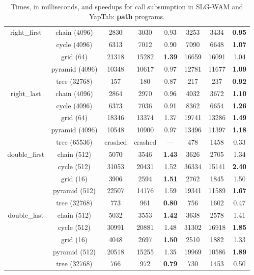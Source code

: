 \begin{table}[ht]
{\begin{tabular}{cc|ccc|ccc}
   \multirow{5}{*}{right\_first} &  \scriptsize{chain  (4096) }  &  2830 & 3030 &  0.93  & 3253 & 3434 &  \textbf{0.95} \\
   &  \scriptsize{cycle  (4096) }  &  6313 & 7012 &  0.90  & 7090 & 6648 &  \textbf{1.07} \\
   &  \scriptsize{grid  (64) }  &  21318 & 15282 &  \textbf{1.39}  & 16659 & 16091 &  1.04 \\
   &  \scriptsize{pyramid  (4096) }  &  10348 & 10617 &  0.97  & 12781 & 11677 &  \textbf{1.09} \\
   &  \scriptsize{tree  (32768) }  &  157 & 180 &  0.87  & 217 & 237 &  \textbf{0.92} \\
   \hline
   \multirow{5}{*}{right\_last} &  \scriptsize{chain  (4096) }  &  2864 & 2970 &  0.96  & 4032 & 3672 &  \textbf{1.10} \\
   &  \scriptsize{cycle  (4096) }  &  6373 & 7036 &  0.91  & 8362 & 6654 &  \textbf{1.26} \\
   &  \scriptsize{grid  (64) }  &  18346 & 13374 &  1.37  & 19741 & 13286 &  \textbf{1.49} \\
   &  \scriptsize{pyramid  (4096) }  &  10548 & 10900 &  0.97  & 13496 & 11397 &  \textbf{1.18} \\
   &  \scriptsize{tree  (65536) }  &  \scriptsize{crashed} & \scriptsize{crashed} &  ---  & 478 & 1458 &  0.33 \\
   \hline
   \multirow{5}{*}{double\_first} &  \scriptsize{chain  (512) }  &  5070 & 3546 &  \textbf{1.43}  & 3626 & 2705 &  1.34 \\
   &  \scriptsize{cycle  (512) }  &  31053 & 20431 &  1.52  & 36334 & 15141 &  \textbf{2.40} \\
   &  \scriptsize{grid  (16) }  &  3906 & 2594 &  \textbf{1.51}  & 2762 & 1845 &  1.50 \\
   &  \scriptsize{pyramid  (512) }  &  22507 & 14176 &  1.59  & 19341 & 11589 &  \textbf{1.67} \\
   &  \scriptsize{tree  (32768) }  &  773 & 961 &  \textbf{0.80}  & 756 & 1602 &  0.47 \\
   \hline
   \multirow{5}{*}{double\_last} &  \scriptsize{chain  (512) }  &  5032 & 3553 &  \textbf{1.42}  & 3638 & 2578 &  1.41 \\
   &  \scriptsize{cycle  (512) }  &  30991 & 20881 &  1.48  & 31302 & 16918 &  \textbf{1.85} \\
   &  \scriptsize{grid  (16) }  &  4048 & 2697 &  \textbf{1.50}  & 2510 & 1882 &  1.33 \\
   &  \scriptsize{pyramid  (512) }  &  20518 & 15255 &  1.35  & 19969 & 10586 &  \textbf{1.89} \\
   &  \scriptsize{tree  (32768) }  &  766 & 972 &  \textbf{0.79}  & 730 & 1453 &  0.50 \\
   \hline
\hline
\end{tabular}
}
\caption{Times, in milliseconds, and speedups for call subsumption in SLG-WAM and YapTab: \textbf{path} programs.}
\label{tbl:result_detail_path}
\end{table}
